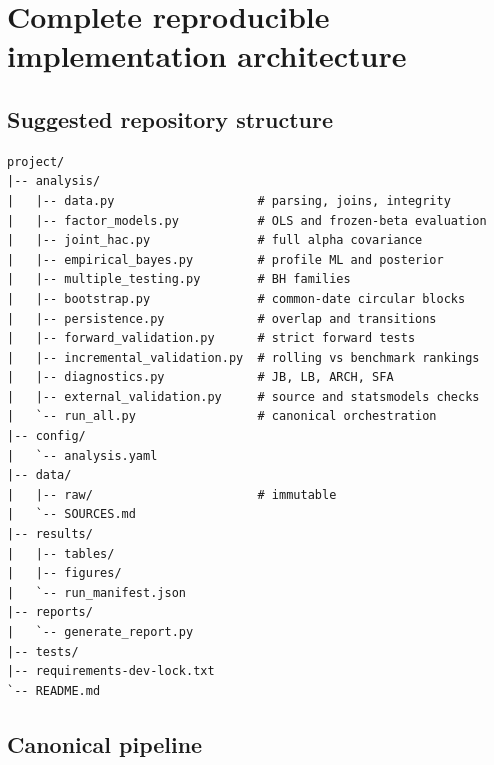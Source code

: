 \hypertarget{implementation}{}
\hypertarget{complete-reproducible-implementation-architecture}{%
\chapter{Complete reproducible implementation
architecture}\label{complete-reproducible-implementation-architecture}}

\hypertarget{suggested-repository-structure}{%
\section{Suggested repository
structure}\label{suggested-repository-structure}}

\begin{verbatim}
project/
|-- analysis/
|   |-- data.py                    # parsing, joins, integrity
|   |-- factor_models.py           # OLS and frozen-beta evaluation
|   |-- joint_hac.py               # full alpha covariance
|   |-- empirical_bayes.py         # profile ML and posterior
|   |-- multiple_testing.py        # BH families
|   |-- bootstrap.py               # common-date circular blocks
|   |-- persistence.py             # overlap and transitions
|   |-- forward_validation.py      # strict forward tests
|   |-- incremental_validation.py  # rolling vs benchmark rankings
|   |-- diagnostics.py             # JB, LB, ARCH, SFA
|   |-- external_validation.py     # source and statsmodels checks
|   `-- run_all.py                 # canonical orchestration
|-- config/
|   `-- analysis.yaml
|-- data/
|   |-- raw/                       # immutable
|   `-- SOURCES.md
|-- results/
|   |-- tables/
|   |-- figures/
|   `-- run_manifest.json
|-- reports/
|   `-- generate_report.py
|-- tests/
|-- requirements-dev-lock.txt
`-- README.md
\end{verbatim}

\hypertarget{canonical-pipeline}{%
\section{Canonical pipeline}\label{canonical-pipeline}}

